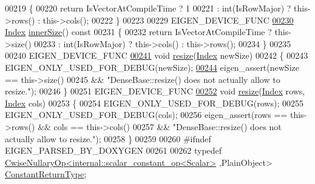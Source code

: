 \begin{DoxyCode}
00219 \textcolor{keyword}{    }\{
00220       \textcolor{keywordflow}{return} IsVectorAtCompileTime ? 1
00221            : int(IsRowMajor) ? this->rows() : this->cols();
00222     \}
00223 
00229     EIGEN\_DEVICE\_FUNC
\hyperlink{group___core___module_a57c6f5516aa86d4c22f382f1a069a319}{00230}     \hyperlink{namespace_eigen_a62e77e0933482dafde8fe197d9a2cfde}{Index} \hyperlink{group___core___module_a57c6f5516aa86d4c22f382f1a069a319}{innerSize}()\textcolor{keyword}{ const}
00231 \textcolor{keyword}{    }\{
00232       \textcolor{keywordflow}{return} IsVectorAtCompileTime ? this->size()
00233            : int(IsRowMajor) ? this->cols() : this->rows();
00234     \}
00235 
00240     EIGEN\_DEVICE\_FUNC
\hyperlink{group___core___module_a13027a493a68a13496610caf3d81bd3e}{00241}     \textcolor{keywordtype}{void} \hyperlink{group___core___module_a13027a493a68a13496610caf3d81bd3e}{resize}(\hyperlink{namespace_eigen_a62e77e0933482dafde8fe197d9a2cfde}{Index} newSize)
00242     \{
00243       EIGEN\_ONLY\_USED\_FOR\_DEBUG(newSize);
\hyperlink{group___core___module_adce933f12d5ff50ac09c11e46a4f6351}{00244}       eigen\_assert(newSize == this->size()
00245                 && \textcolor{stringliteral}{"DenseBase::resize() does not actually allow to resize."});
00246     \}
00251     EIGEN\_DEVICE\_FUNC
\hyperlink{group___core___module_aef40c2ee48a85a799270c8258cc12b76}{00252}     \textcolor{keywordtype}{void} \hyperlink{group___core___module_aef40c2ee48a85a799270c8258cc12b76}{resize}(\hyperlink{namespace_eigen_a62e77e0933482dafde8fe197d9a2cfde}{Index} rows, \hyperlink{namespace_eigen_a62e77e0933482dafde8fe197d9a2cfde}{Index} cols)
00253     \{
00254       EIGEN\_ONLY\_USED\_FOR\_DEBUG(rows);
00255       EIGEN\_ONLY\_USED\_FOR\_DEBUG(cols);
00256       eigen\_assert(rows == this->rows() && cols == this->cols()
00257                 && \textcolor{stringliteral}{"DenseBase::resize() does not actually allow to resize."});
00258     \}
00259 
00260 \textcolor{preprocessor}{#ifndef EIGEN\_PARSED\_BY\_DOXYGEN}
00261 
00262     \textcolor{keyword}{typedef} \hyperlink{group___core___module_class_eigen_1_1_cwise_nullary_op}{CwiseNullaryOp<internal::scalar\_constant\_op<Scalar>}
      ,PlainObject> \hyperlink{group___core___module_class_eigen_1_1_cwise_nullary_op}{ConstantReturnType};

\end{DoxyCode}
